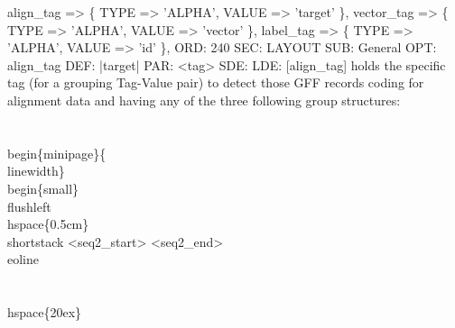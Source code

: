 \documentclass[11pt]{article}
\def\nwendcode{\endtrivlist \endgroup} %
\begin{document}
\label{sec:groupingtagkeys}
\nwenddocs{}\plusendmoddef
align_tag                  => \{ TYPE => 'ALPHA', VALUE => 'target'   \},
vector_tag                 => \{ TYPE => 'ALPHA', VALUE => 'vector'   \},
label_tag                  => \{ TYPE => 'ALPHA', VALUE => 'id'       \},
\eatline
{}\nwendcode{}\plusendmoddef
ORD: 240
SEC: LAYOUT
SUB: General
OPT: align_tag
DEF: |target|
PAR: <tag>
SDE: 
LDE: 
[align_tag] holds the specific tag (for a grouping Tag-Value pair) to detect 
those GFF records coding for alignment data and having any of the three
following group structures:\\\\%
\\begin\{minipage\}\{\\linewidth\}
\\begin\{small\}
\\flushleft
 \\hspace\{0.5cm\}\\shortstack%
   <seq2_start> <seq2_end> \\eoline\\\\\\hspace\{20ex\}
\end{document}
